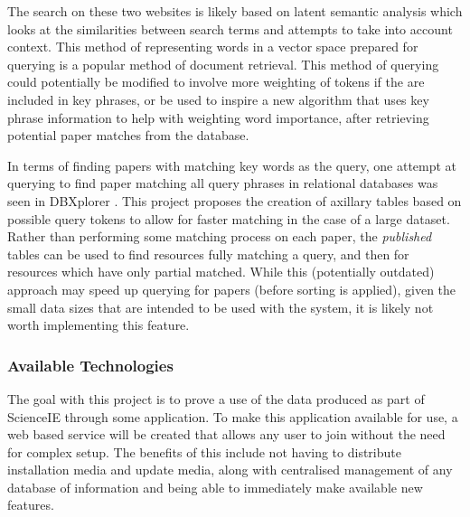 The search on these two websites is likely based on latent semantic analysis \cite{Landauer1998,AswaniKumar2012} which looks at the similarities between search terms and attempts to take into account context. This method of representing words in a vector space prepared for querying is a popular method of document retrieval. This method of querying could potentially be modified to involve more weighting of tokens if the are included in key phrases, or be used to inspire a new algorithm that uses key phrase information to help with weighting word importance, after retrieving potential paper matches from the database.

In terms of finding papers with matching key words as the query, one attempt at querying to find paper matching all query phrases in relational databases was seen in DBXplorer \cite{Agrawal2002}. This project proposes the creation of axillary tables based on possible query tokens to allow for faster matching in the case of a large dataset. Rather than performing some matching process on each paper, the \textit{published} tables can be used to find resources fully matching a query, and then for resources which have only partial matched. While this (potentially outdated) approach may speed up querying for papers (before sorting is applied), given the small data sizes that are intended to be used with the system, it is likely not worth implementing this feature. 

\subsubsection*{Available Technologies}
The goal with this project is to prove a use of the data produced as part of ScienceIE through some application. To make this application available for use, a web based service will be created that allows any user to join without the need for complex setup. The benefits of this include not having to distribute installation media and update media, along with centralised management of any database of information and being able to immediately make available new features.


